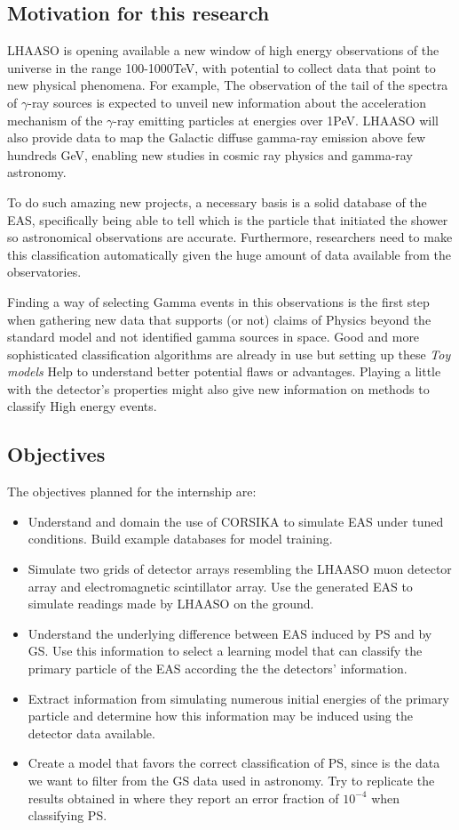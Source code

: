 \documentclass{article}
\begin{document}
\subsection{Motivation for this research}
LHAASO is opening available a new window of high energy observations of the universe in the range 100-1000TeV, with potential to collect data that point to new physical phenomena. For example, The observation of the tail of the spectra of $\gamma$-ray sources is expected to unveil new information about the acceleration mechanism of the $\gamma$-ray emitting particles at energies over 1PeV. LHAASO will also provide data to map the Galactic diffuse gamma-ray emission above few hundreds GeV, enabling new studies in cosmic ray physics and gamma-ray astronomy.  

To do such amazing new projects, a necessary basis is a solid database of the EAS, specifically being able to tell which is the particle that initiated the shower so astronomical observations are accurate. Furthermore, researchers need to make this classification automatically given the huge amount of data available from the observatories. 

Finding a way of selecting Gamma events in this observations is the first step when gathering new data that supports (or not) claims of Physics beyond the standard model and not identified gamma sources in space. Good and more sophisticated classification algorithms are already in use but setting up these \textit{Toy models} Help to understand better potential flaws or advantages. Playing a little with the detector's properties might also give new information on methods to classify High energy events.
\subsection{Objectives}
The objectives planned for the internship are:
\begin{itemize}
    \item Understand and domain the use of CORSIKA to simulate EAS under tuned conditions. Build example databases for model training.
    \item Simulate two grids of detector arrays resembling the LHAASO muon detector array and electromagnetic scintillator array. Use the generated EAS to simulate readings  made by LHAASO on the ground.
    \item Understand the underlying difference between EAS induced by PS and by GS. Use this information to select a learning model that can classify the primary particle of the EAS according the the detectors' information. 
    \item Extract information from simulating numerous initial energies of the primary particle and determine how this information may be induced using the detector data available.
    \item Create a model that favors the correct classification of PS, since is the data we want to filter from the GS data used in astronomy. Try to replicate the results obtained in \cite{UHEgammapaper} where they report an error fraction of $10^{-4}$ when classifying PS.  
    
\end{itemize}
\end{document}
